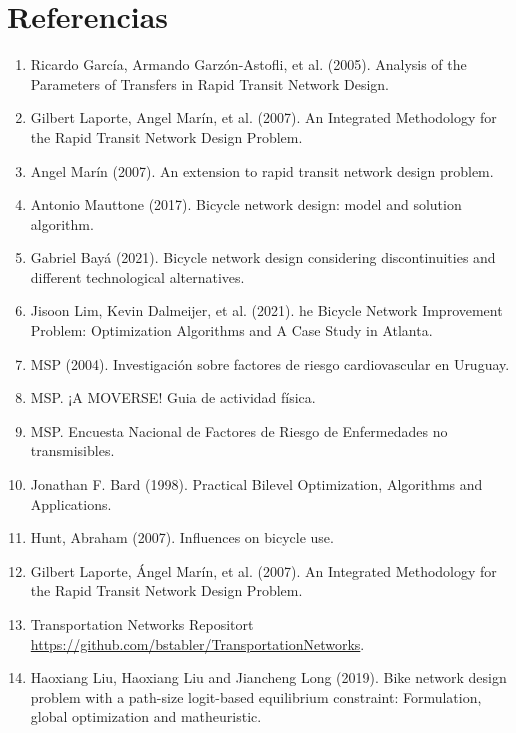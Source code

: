 \documentclass{article}
\begin{document}
  \section{Referencias}

  \begin{enumerate}
    \item{\label{garcia2005} Ricardo García, Armando Garzón-Astofli, et al. (2005). Analysis of the Parameters of Transfers in Rapid Transit Network Design.}
    \item{\label{laporte2007} Gilbert Laporte, Angel Marín, et al. (2007). An Integrated Methodology for the Rapid Transit Network Design Problem.}
    \item{\label{marin2007} Angel Marín (2007). An extension to rapid transit network design problem.}
    \item{\label{mauttone2017} Antonio Mauttone (2017). Bicycle network design: model and solution algorithm.}
    \item{\label{baya2021} Gabriel Bayá (2021). Bicycle network design considering discontinuities and different technological alternatives.}
    \item{\label{lim2021} Jisoon Lim, Kevin Dalmeijer, et al. (2021). he Bicycle Network Improvement Problem: Optimization Algorithms and A Case Study in Atlanta.}
    \item{\label{heartrisksuy} MSP (2004). Investigación sobre factores de riesgo cardiovascular en Uruguay.}
    \item{\label{mspphisicalactivityguid} MSP. ¡A MOVERSE! Guia de actividad física.}
    \item{\label{mspsurveyriskfactors} MSP. Encuesta Nacional de Factores de Riesgo de Enfermedades no transmisibles.}
    \item{\label{bardbook} Jonathan F. Bard (1998). Practical Bilevel Optimization, Algorithms and Applications.}
    \item{\label{hunt2007} Hunt, Abraham (2007). Influences on bicycle use.}
    \item{\label{laporte2007} Gilbert Laporte, Ángel Marín, et al. (2007). An Integrated Methodology for the Rapid Transit Network Design Problem.}
    \item{\label{transportationnetworkrepo} Transportation Networks Repositort \url{https://github.com/bstabler/TransportationNetworks}.}
    \item{\label{liu2019} Haoxiang Liu, Haoxiang Liu and Jiancheng Long (2019). Bike network design problem with a path-size logit-based equilibrium constraint: Formulation, global optimization and matheuristic.}

\end{enumerate}
\end{document}
